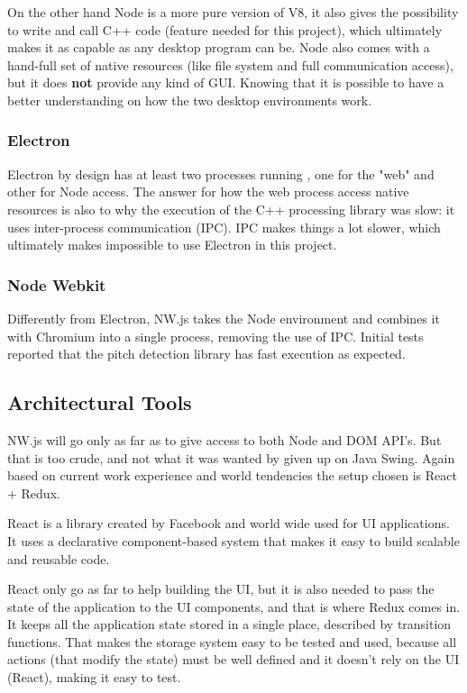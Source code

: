 On the other hand Node is a more pure version of V8, it also gives the possibility
to write and call C++ code (feature needed for this project), which ultimately
makes it as capable as any desktop
program can be. Node also comes with a hand-full set of native resources (like
file system and full communication access), but it does \textbf{not} provide
any kind of GUI. Knowing that it is possible to have a better understanding on
how the two desktop environments work.

\subsubsection{Electron}
Electron by design has at least two processes running \cite{ElectronVsNW},
one for the "web" and other
for Node access. The answer for how the web process access native resources is
also to why the execution of the C++ processing library was slow: it uses
inter-process communication (IPC). IPC makes things a lot slower, which ultimately
makes impossible to use Electron in this project.

\subsubsection{Node Webkit}
Differently from Electron, NW.js \cite{NWjs, ElectronVsNW} takes the Node environment
and combines it with Chromium into a single process, removing the use of IPC.
Initial tests reported that the pitch detection library has fast
execution as expected.

\subsection{Architectural Tools}
NW.js will go only as far as to give access to both Node and DOM API's. But that
is too crude, and not what it was wanted by given up on Java Swing. Again based on
current work experience and world tendencies the setup chosen is React + Redux. 

React \cite{React} is a library created by Facebook and world wide used for UI applications.
It uses a declarative component-based system that makes it easy to build scalable
and reusable code.

React only go as far to help building the UI, but it is also needed to pass the state
of the application to the UI components, and that is where Redux \cite{Redux} comes in.
It keeps all the application state stored in a single place, described by transition
functions. That makes the storage system easy to be tested and used, because all
actions (that modify the state) must be well defined and it doesn't rely on the
UI (React), making it easy to test.

